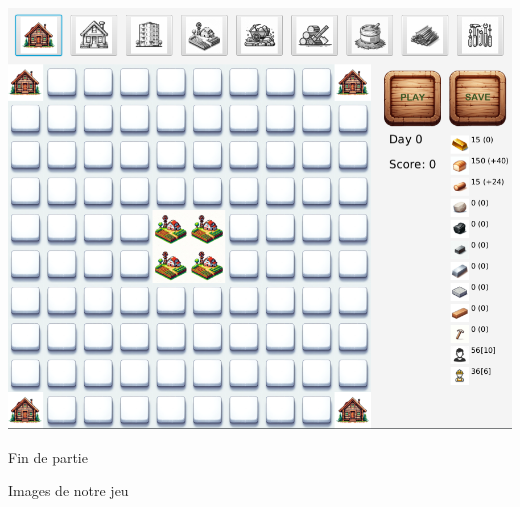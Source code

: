 \documentclass[a4paper,11pt]{article}
\begin{document}
\begin{table}[ht]
\begin{subtable}{.3\linewidth}
		\includegraphics[width=1\linewidth]{mid_game_2.png}
		\caption{Fin de partie}
		\label{subfig:image4}
	\end{subtable}
	\caption{Images de notre jeu}
	\label{fig:overall_label}
\end{table}
\end{document}
